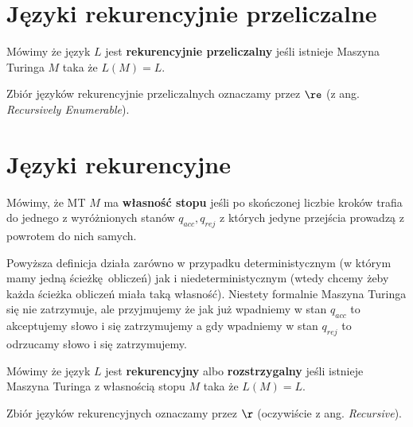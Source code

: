\section {Języki rekurencyjnie przeliczalne}

\begin{definition}
    Mówimy że język \( L \) jest \textbf{rekurencyjnie przeliczalny} jeśli istnieje Maszyna Turinga \( M \) taka że \( L(M) = L \).
    
    Zbiór języków rekurencyjnie przeliczalnych oznaczamy przez \textbf{\( \re \)} (z ang. \textit{Recursively Enumerable}).
\end{definition}

\section {Języki rekurencyjne}

\begin{definition}
    Mówimy, że MT \( M \) ma \textbf{własność stopu} jeśli po skończonej liczbie kroków trafia do jednego z wyróżnionych stanów \( q_{acc}, q_{rej} \) z których jedyne przejścia prowadzą z powrotem do nich samych.
\end{definition}

Powyższa definicja działa zarówno w przypadku deterministycznym (w którym mamy jedną ścieżkę obliczeń) jak i niedeterministycznym (wtedy chcemy żeby każda ścieżka obliczeń miała taką własność).
Niestety formalnie Maszyna Turinga się nie zatrzymuje, ale przyjmujemy że jak już wpadniemy w stan \( q_{acc} \) to akceptujemy słowo i się zatrzymujemy a gdy wpadniemy w stan \( q_{rej} \) to odrzucamy słowo i się zatrzymujemy.

\begin{definition}
    Mówimy że język \( L \) jest \textbf{rekurencyjny} albo \textbf{rozstrzygalny} jeśli istnieje Maszyna Turinga z własnością stopu \( M \) taka że \( L(M) = L \).
    
    Zbiór języków rekurencyjnych oznaczamy przez \textbf{\( \r \)} (oczywiście z ang. \textit{Recursive}).
\end{definition}